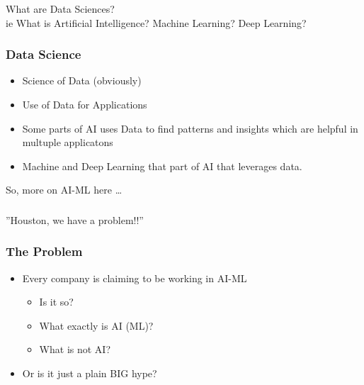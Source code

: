 \begin{frame}[fragile]\frametitle{}
\begin{center}
{\Large What are Data Sciences? \\ \small ie What is Artificial Intelligence? Machine Learning? Deep Learning?}
\end{center}
\end{frame}


\begin{frame}[fragile]\frametitle{Data Science}

\begin{itemize}
\item Science of Data (obviously)
\item Use of Data for Applications
\item Some parts of AI uses Data to find patterns and insights which are helpful in multuple applicatons
\item Machine and Deep Learning that part of AI that leverages data.
\end{itemize}

So, more on AI-ML here \ldots

\end{frame}


\begin{frame}[fragile]\frametitle{}
\begin{center}
{\Large ''Houston, we have a problem!!''}
\end{center}
\end{frame}

\begin{frame}[fragile]\frametitle{The Problem}

\begin{itemize}
\item Every company is claiming to be working in AI-ML
\begin{itemize}
\item Is it so?
\item What exactly is AI (ML)?
\item What is not AI?
\end{itemize}

\item Or is it just a plain BIG hype?

\end{itemize}
	  
\end{frame}


